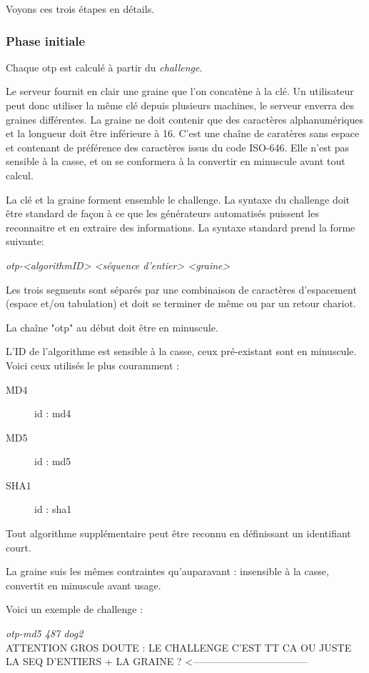 \documentclass{../res/univ-projet}
\begin{document}
    Voyons ces trois étapes en détails.

    \subsubsection{Phase initiale}
      Chaque otp est calculé à partir du \emph{challenge}.

      Le serveur fournit en clair une graine que l'on concatène à la clé. Un 
utilisateur peut donc utiliser la même clé depuis plusieurs machines, le serveur 
enverra des graines différentes. La graine ne doit contenir que des caractères 
alphanumériques et la longueur doit être inférieure à 16. C'est une chaîne de 
caratères sans espace et contenant de préférence des caractères issus du code 
ISO-646. Elle n'est pas sensible à la casse, et on se conformera à la convertir 
en minuscule avant tout calcul.

      La clé et la graine forment ensemble le challenge. La syntaxe du challenge 
doit être standard de façon à ce que les générateurs automatisés puissent les 
reconnaitre et en extraire des informations. La syntaxe standard prend la forme 
suivante:
      \begin{center}
          \emph{otp-<algorithmID> <séquence d'entier> <graine>}\\
      \end{center}
      
      Les trois segments sont séparés par une combinaison de caractères 
d'espacement (espace et/ou tabulation) et doit se terminer de même ou par un 
retour chariot. 

      La chaîne "otp" au début doit être en minuscule.

      L'ID de l'algorithme est sensible à la casse, ceux pré-existant sont en 
minuscule. Voici ceux utilisés le plus couramment :
      \begin{description}
          \item [MD4] id : md4
          \item [MD5] id : md5
          \item [SHA1] id : sha1 
      \end{description}
      Tout algorithme supplémentaire peut être reconnu en définissant un 
identifiant court.

      La graine suis les mêmes contraintes qu'auparavant : insensible à la 
casse, convertit en minuscule avant usage.

      Voici un exemple de challenge :
      \begin{center}
          \emph{otp-md5 487 dog2 }\\    ATTENTION GROS DOUTE : LE CHALLENGE 
C'EST TT CA OU JUSTE LA SEQ D'ENTIERS + LA GRAINE ? 
<-----------------------------------
      \end{center}
\end{document}
